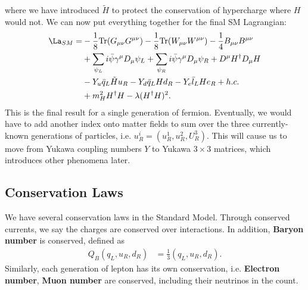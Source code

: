 \documentclass[relqm.tex]{subfiles}
\begin{document}
where we have introduced $\tilde{H}$ to protect the conservation of hypercharge where $H$ would not.
We can now put everything together for the final SM Lagrangian:
\begin{align}
    \begin{split}
        \La_{SM} = &-\frac18\text{Tr}(G_{\mu\nu}G^{\mu\nu}) - \frac18\text{Tr}(W_{\mu\nu}W^{\mu\nu}) - \frac14B_{\mu\nu}B^{\mu\nu} \\
                   &+ \sum_{\psi_L}i\bar{\psi}\gamma^\mu D_\mu\psi_L + \sum_{\psi_R} i\bar{\psi}\gamma^\mu D_\mu \psi_R + D^\mu H^\dagger D_\mu H \\
                   &- Y_u\bar{q}_L\tilde{H}u_R - Y_d\bar{q}_LHd_R - Y_e\bar{l}_LHe_R + h.c. \\
                   &+ m_H^2 H^\dagger H - \lambda(H^\dagger H)^2.
    \end{split}
\end{align}
This is the final result for a single generation of fermion. 
Eventually, we would have to add another index onto matter fields to sum over the three currently-known generations of particles, i.e. $u_R^i = (u_R^1,u_R^2,U_R^3)$.
This will cause us to move from Yukawa coupling numbers $Y$ to Yukawa $3\times3$ matrices, which introduces other phenomena later.

\section{Conservation Laws}
We have several conservation laws in the Standard Model. 
Through conserved currents, we say the charges are conserved over interactions. 
In addition, \textbf{Baryon number} is conserved, defined as
\begin{align}
    Q_B(q_L,u_R,d_R) &= \frac13(q_L,u_R,d_R).
\end{align}
Similarly, each generation of lepton has its own conservation, i.e. \textbf{Electron number}, \textbf{Muon number} are conserved, including their neutrinos in the count. 


\chapter{}

\chapter{}
\end{document}
